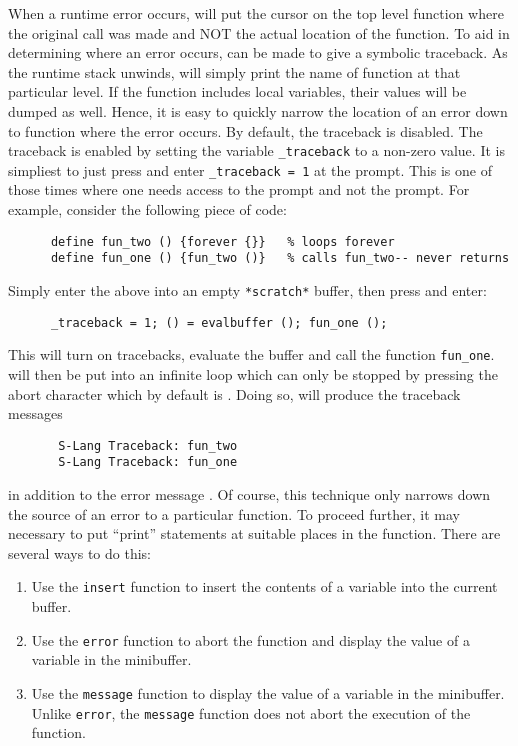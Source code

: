  When a runtime error occurs, \jed{} will put the cursor on the top level
  function where the original call was made and NOT the actual location of
  the function.  To aid in determining where an error occurs, \jed{} can be
  made to give a symbolic traceback.  As the \slang{} runtime stack unwinds,
  \slang{} will simply print the name of function at that particular level.
  If the function includes local variables, their values will be dumped as
  well.  Hence, it is easy to quickly narrow the location of an error down
  to function where the error occurs.  By default, the traceback is
  disabled.  The traceback is enabled by setting the \slang{} variable
  \verb|_traceback| to a non-zero value.  It is simpliest to just press
   and enter \verb|_traceback = 1| at the 
  prompt.  This is one of those times where one needs access to the
   prompt and not the  prompt. For example, consider
  the following piece of code:
\begin{verbatim}
      define fun_two () {forever {}}   % loops forever
      define fun_one () {fun_two ()}   % calls fun_two-- never returns
\end{verbatim}
  Simply enter the above into an empty \jed{} \verb|*scratch*| buffer, then
  press  and enter:
\begin{verbatim} 
      _traceback = 1; () = evalbuffer (); fun_one ();
\end{verbatim} 
  This will turn on tracebacks, evaluate the buffer and call the
  function \verb|fun_one|.  \jed{} will then be put into an infinite loop which
  can only be stopped by pressing the abort character which by default is
  . Doing so, will produce the traceback messages
\begin{verbatim}
       S-Lang Traceback: fun_two
       S-Lang Traceback: fun_one
\end{verbatim}
  in addition to the error message .  Of course, this
  technique only narrows down the source of an error to a particular
  function. To proceed further, it may necessary to put ``print'' statements
  at suitable places in the function.  There are several ways to do this:
\begin{itemize}
\begin{enumerate}
\item Use the \verb|insert| function to insert the contents of a variable
      into the current buffer.

\item Use the \verb|error| function to abort the function and display the
      value of a variable in the minibuffer.

\item Use the \verb|message| function to display the value of a variable in
      the minibuffer.  Unlike \verb|error|, the \verb|message| function does
      not abort the execution of the function.
\end{enumerate}
\end{itemize} 

